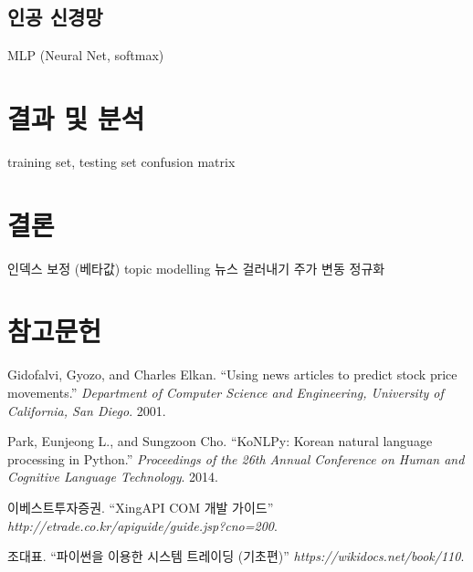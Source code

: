 \documentclass[a4paper,10pt]{article}
\begin{document}
\subsection{인공 신경망}

MLP (Neural Net, softmax)

\section{결과 및 분석}

training set, testing set
confusion matrix

\section{결론}

인덱스 보정 (베타값)
topic modelling 뉴스 걸러내기
주가 변동 정규화

\section*{참고문헌}

\begin{enumerate}[ {[}1{]} ]
\item Gidofalvi, Gyozo, and Charles Elkan. ``Using news articles to predict stock price movements.'' \textit{Department of Computer Science and Engineering, University of California, San Diego}. 2001.
\item Park, Eunjeong L., and Sungzoon Cho. ``KoNLPy: Korean natural language processing in Python.'' \textit{Proceedings of the 26th Annual Conference on Human and Cognitive Language Technology}. 2014.
\item 이베스트투자증권. ``XingAPI COM 개발 가이드'' \textit{http://etrade.co.kr/apiguide/guide.jsp?cno=200}.
\item 조대표. ``파이썬을 이용한 시스템 트레이딩 (기초편)'' \textit{https://wikidocs.net/book/110}.
\end{enumerate}
\end{document}
